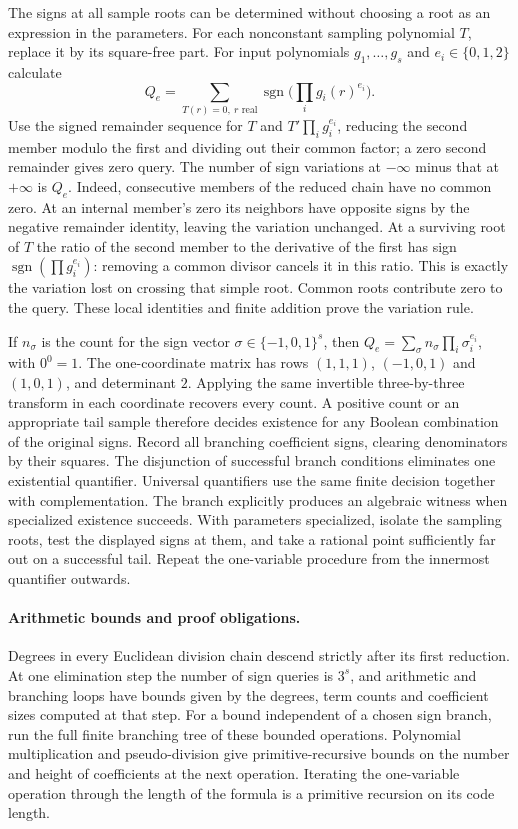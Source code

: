 \documentclass[10pt,letterpaper]{article}
\begin{document}
The signs at all sample roots can be determined without choosing a root
as an expression in the parameters. For each nonconstant sampling
polynomial $T$, replace it by its square-free part. For input
polynomials $g_1,\ldots,g_s$ and $e_i\in\{0,1,2\}$ calculate
\[
 Q_e=\sum_{T(r)=0,\ r\text{ real}}
                    \operatorname{sgn}\big(\textstyle\prod_i g_i(r)^{e_i}\big).
\]
Use the signed remainder sequence for $T$ and $T'\prod_i g_i^{e_i}$,
reducing the second member modulo the first and dividing out their
common factor; a zero second remainder gives zero query. The number of
sign variations at $-\infty$ minus that at $+\infty$ is $Q_e$.
Indeed, consecutive members of the reduced chain have no common zero.
At an internal member's zero its neighbors have opposite signs by the
negative remainder identity, leaving the variation unchanged.
At a surviving root of $T$ the ratio of the second member to the
derivative of the first has sign $\operatorname{sgn}(\prod g_i^{e_i})$:
removing a common divisor cancels it in this ratio. This is exactly
the variation lost on crossing that simple root. Common roots contribute
zero to the query. These local identities and finite addition prove
the variation rule.

If $n_\sigma$ is the count for the sign vector
$\sigma\in\{-1,0,1\}^s$, then
$Q_e=\sum_\sigma n_\sigma\prod_i\sigma_i^{e_i}$, with $0^0=1$.
The one-coordinate matrix has rows $(1,1,1)$, $(-1,0,1)$ and
$(1,0,1)$, and determinant $2$. Applying the same invertible
three-by-three transform in each coordinate recovers every count.
A positive count or an appropriate tail sample therefore decides
existence for any Boolean combination of the original signs. Record
all branching coefficient signs, clearing denominators by their
squares. The disjunction of successful branch conditions eliminates
one existential quantifier. Universal quantifiers use the same
finite decision together with complementation. The branch explicitly
produces an algebraic witness when specialized existence succeeds.
With parameters specialized, isolate the sampling roots, test the
displayed signs at them, and take a rational point sufficiently far
out on a successful tail. Repeat the one-variable procedure from the
innermost quantifier outwards.

\paragraph{Arithmetic bounds and proof obligations.}
Degrees in every Euclidean division chain descend strictly after its
first reduction. At one elimination step the number of sign queries is
$3^s$, and arithmetic and branching loops have bounds given by the
degrees, term counts and coefficient sizes computed at that step.
For a bound independent of a chosen sign branch, run the full
finite branching tree of these bounded operations. Polynomial
multiplication and pseudo-division give primitive-recursive bounds
on the number and height of coefficients at the next operation.
Iterating the one-variable operation through the length of the formula
is a primitive recursion on its code length.
\end{document}
